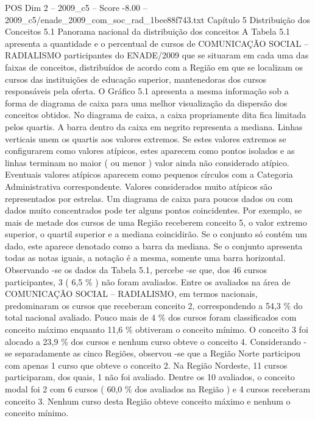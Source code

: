 \begin{textsample}{POS Dim 2 – 2009\_c5 – Score -8.00 – 2009\_c5/enade\_2009\_com\_soc\_rad\_1bee88f743.txt}  \label{ex:f2_pos_423}
Capítulo 5 Distribuição dos Conceitos 5.1 Panorama nacional da distribuição dos conceitos A Tabela 5.1 apresenta a quantidade e o percentual de cursos de COMUNICAÇÃO SOCIAL – RADIALISMO participantes do ENADE/2009 que se situaram em cada uma das faixas de conceitos, distribuídos de acordo com a Região em que se localizam os cursos das instituições de educação superior, mantenedoras dos cursos responsáveis pela oferta.
O Gráfico 5.1 apresenta a mesma informação sob a forma de diagrama de caixa para uma melhor visualização da dispersão dos conceitos obtidos.
No diagrama de caixa, a caixa propriamente dita fica limitada pelos quartis.
A barra dentro da caixa em negrito representa a mediana.
Linhas verticais unem os quartis aos valores extremos.
Se estes valores extremos se configurarem como valores atípicos, estes aparecem como pontos isolados e as linhas terminam no maior ( ou menor ) valor ainda não considerado atípico.
Eventuais valores atípicos aparecem como pequenos círculos com a Categoria Administrativa correspondente.
Valores considerados muito atípicos são representados por estrelas.
Um diagrama de caixa para poucos dados ou com dados muito concentrados pode ter alguns pontos coincidentes.
Por exemplo, se mais de metade dos cursos de uma Região receberem conceito 5, o valor extremo superior, o quartil superior e a mediana coincidirão.
Se o conjunto só contém um dado, este aparece denotado como a barra da mediana.
Se o conjunto apresenta todas as notas iguais, a notação é a mesma, somente uma barra horizontal.
Observando -se os dados da Tabela 5.1, percebe -se que, dos 46 cursos participantes, 3 ( 6,5 \% ) não foram avaliados.
Entre os avaliados na área de COMUNICAÇÃO SOCIAL – RADIALISMO, em termos nacionais, predominaram os cursos que receberam conceito 2, correspondendo a 54,3 \% do total nacional avaliado.
Pouco mais de 4 \% dos cursos foram classificados com conceito máximo enquanto 11,6 \% obtiveram o conceito mínimo.
O conceito 3 foi alocado a 23,9 \% dos cursos e nenhum curso obteve o conceito 4.
Considerando -se separadamente as cinco Regiões, observou -se que a Região Norte participou com apenas 1 curso que obteve o conceito 2.
Na Região Nordeste, 11 cursos participaram, dos quais, 1 não foi avaliado.
Dentre os 10 avaliados, o conceito modal foi 2 com 6 cursos ( 60,0 \% dos avaliados na Região ) e 4 cursos receberam conceito 3.
Nenhum curso desta Região obteve conceito máximo e nenhum o conceito mínimo.

\end{textsample}
